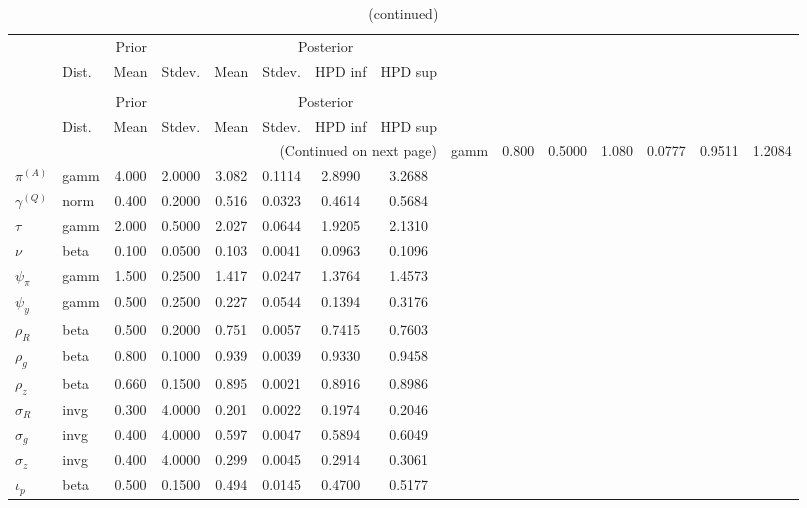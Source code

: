  
\begin{center}
\begin{longtable}{llcccccc} 
\caption{Results from Metropolis-Hastings (parameters)}
 \label{Table:MHPosterior:1}\\
\toprule 
  & \multicolumn{3}{c}{Prior}  &  \multicolumn{4}{c}{Posterior} \\
  \cmidrule(r{.75em}){2-4} \cmidrule(r{.75em}){5-8}
  & Dist. & Mean  & Stdev. & Mean & Stdev. & HPD inf & HPD sup\\
\midrule \endfirsthead 
\caption{(continued)}\\\toprule 
  & \multicolumn{3}{c}{Prior}  &  \multicolumn{4}{c}{Posterior} \\
  \cmidrule(r{.75em}){2-4} \cmidrule(r{.75em}){5-8}
  & Dist. & Mean  & Stdev. & Mean & Stdev. & HPD inf & HPD sup\\
\midrule \endhead 
\bottomrule \multicolumn{8}{r}{(Continued on next page)} \endfoot 
\bottomrule \endlastfoot 
${r_{A}}$ & gamm &   0.800 & 0.5000 &   1.080& 0.0777 &  0.9511 &  1.2084 \\ 
${\pi^{(A)}}$ & gamm &   4.000 & 2.0000 &   3.082& 0.1114 &  2.8990 &  3.2688 \\ 
${\gamma^{(Q)}}$ & norm &   0.400 & 0.2000 &   0.516& 0.0323 &  0.4614 &  0.5684 \\ 
${\tau}$ & gamm &   2.000 & 0.5000 &   2.027& 0.0644 &  1.9205 &  2.1310 \\ 
${\nu}$ & beta &   0.100 & 0.0500 &   0.103& 0.0041 &  0.0963 &  0.1096 \\ 
${\psi_\pi}$ & gamm &   1.500 & 0.2500 &   1.417& 0.0247 &  1.3764 &  1.4573 \\ 
${\psi_y}$ & gamm &   0.500 & 0.2500 &   0.227& 0.0544 &  0.1394 &  0.3176 \\ 
${\rho_R}$ & beta &   0.500 & 0.2000 &   0.751& 0.0057 &  0.7415 &  0.7603 \\ 
${\rho_{g}}$ & beta &   0.800 & 0.1000 &   0.939& 0.0039 &  0.9330 &  0.9458 \\ 
${\rho_z}$ & beta &   0.660 & 0.1500 &   0.895& 0.0021 &  0.8916 &  0.8986 \\ 
${\sigma_R}$ & invg &   0.300 & 4.0000 &   0.201& 0.0022 &  0.1974 &  0.2046 \\ 
${\sigma_{g}}$ & invg &   0.400 & 4.0000 &   0.597& 0.0047 &  0.5894 &  0.6049 \\ 
${\sigma_z}$ & invg &   0.400 & 4.0000 &   0.299& 0.0045 &  0.2914 &  0.3061 \\ 
${\iota_p}$ & beta &   0.500 & 0.1500 &   0.494& 0.0145 &  0.4700 &  0.5177 \\ 
\end{longtable}
 \end{center}
